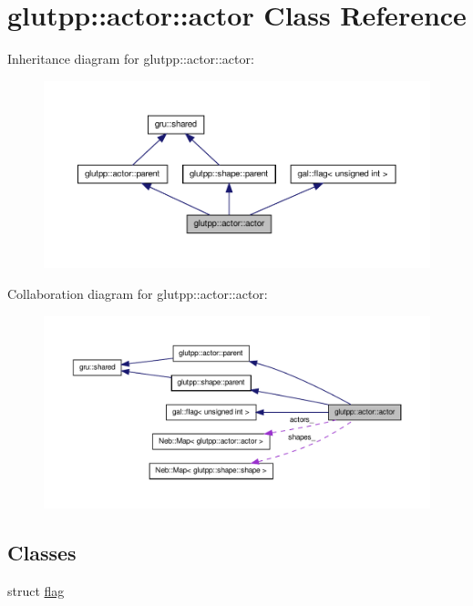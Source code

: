 \hypertarget{classglutpp_1_1actor_1_1actor}{\section{glutpp\-:\-:actor\-:\-:actor \-Class \-Reference}
\label{classglutpp_1_1actor_1_1actor}
}


\-Inheritance diagram for glutpp\-:\-:actor\-:\-:actor\-:
\nopagebreak
\begin{figure}[H]
\begin{center}
\leavevmode
\includegraphics[width=350pt]{classglutpp_1_1actor_1_1actor__inherit__graph}
\end{center}
\end{figure}


\-Collaboration diagram for glutpp\-:\-:actor\-:\-:actor\-:
\nopagebreak
\begin{figure}[H]
\begin{center}
\leavevmode
\includegraphics[width=350pt]{classglutpp_1_1actor_1_1actor__coll__graph}
\end{center}
\end{figure}
\subsection*{\-Classes}
\begin{DoxyCompactItemize}
\item 
struct \hyperlink{structglutpp_1_1actor_1_1actor_1_1flag}{flag}
\end{DoxyCompactItemize}
